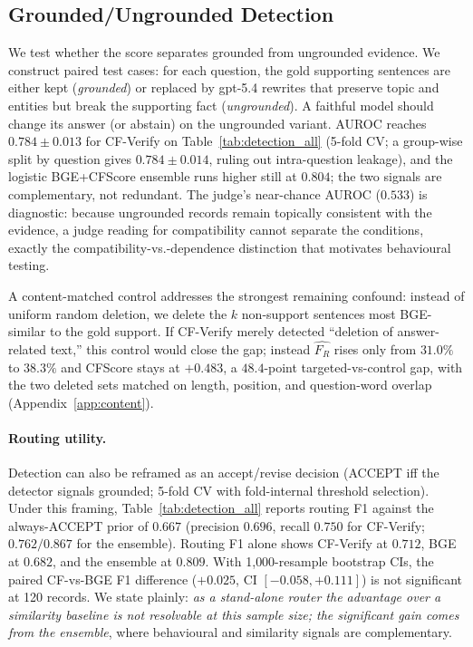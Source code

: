 \documentclass[11pt]{article}
\begin{document}
\subsection{Grounded/Ungrounded Detection}
\label{sec:detection}
We test whether the score separates grounded from ungrounded evidence. We construct paired test cases: for each question, the gold supporting sentences are either kept (\emph{grounded}) or replaced by gpt-5.4 rewrites that preserve topic and entities but break the supporting fact (\emph{ungrounded}). A faithful model should change its answer (or abstain) on the ungrounded variant. AUROC reaches $0.784 \pm 0.013$ for CF-Verify on Table~\ref{tab:detection_all} (5-fold CV; a group-wise split by question gives $0.784 \pm 0.014$, ruling out intra-question leakage), and the logistic BGE+CFScore ensemble runs higher still at $0.804$; the two signals are complementary, not redundant. The judge's near-chance AUROC ($0.533$) is diagnostic: because ungrounded records remain topically consistent with the evidence, a judge reading for compatibility cannot separate the conditions, exactly the compatibility-vs.-dependence distinction that motivates behavioural testing.

A content-matched control addresses the strongest remaining confound: instead of uniform random deletion, we delete the $k$ non-support sentences most BGE-similar to the gold support. If CF-Verify merely detected ``deletion of answer-related text,'' this control would close the gap; instead $\widehat{F_R}$ rises only from $31.0\%$ to $38.3\%$ and CFScore stays at $+0.483$, a $48.4$-point targeted-vs-control gap, with the two deleted sets matched on length, position, and question-word overlap (Appendix~\ref{app:content}).

\paragraph{Routing utility.}
Detection can also be reframed as an accept/revise decision (ACCEPT iff the detector signals grounded; 5-fold CV with fold-internal threshold selection). Under this framing, Table~\ref{tab:detection_all} reports routing F1 against the always-ACCEPT prior of $0.667$ (precision $0.696$, recall $0.750$ for CF-Verify; $0.762/0.867$ for the ensemble). Routing F1 alone shows CF-Verify at $0.712$, BGE at $0.682$, and the ensemble at $0.809$. With 1{,}000-resample bootstrap CIs, the paired CF-vs-BGE F1 difference ($+0.025$, CI $[-0.058,+0.111]$) is not significant at 120 records. We state plainly: \emph{as a stand-alone router the advantage over a similarity baseline is not resolvable at this sample size; the significant gain comes from the ensemble}, where behavioural and similarity signals are complementary.
\end{document}
